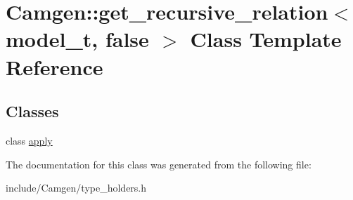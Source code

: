 \hypertarget{a00247}{\section{Camgen\-:\-:get\-\_\-recursive\-\_\-relation$<$ model\-\_\-t, false $>$ Class Template Reference}
\label{a00247}
}
\subsection*{Classes}
\begin{DoxyCompactItemize}
\item 
class \hyperlink{a00013}{apply}
\end{DoxyCompactItemize}


The documentation for this class was generated from the following file\-:\begin{DoxyCompactItemize}
\item 
include/\-Camgen/type\-\_\-holders.\-h\end{DoxyCompactItemize}
